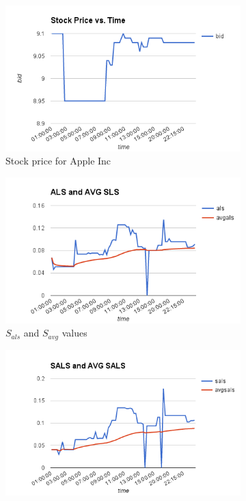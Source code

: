 \documentclass[a4paper,11pt]{article}
\begin{document}
\begin{figure}
\begin{subfigure}{.5\textwidth}
  \centering
  \includegraphics[width=.8\linewidth]{Stock_Price.png}
  \caption{Stock price for Apple Inc}
  \label{fig:sfig1}
\end{subfigure}%
\begin{subfigure}{.5\textwidth}
  \centering
  \includegraphics[width=.8\linewidth]{ALS.png}
  \caption{$S_{als}$ and $S_{avg}$ values}
  \label{fig:sfig2}
\end{subfigure}
\begin{subfigure}{.5\textwidth}
  \centering
  \includegraphics[width=.8\linewidth]{SALS.png}

\end{subfigure}
\end{figure}
\end{document}
